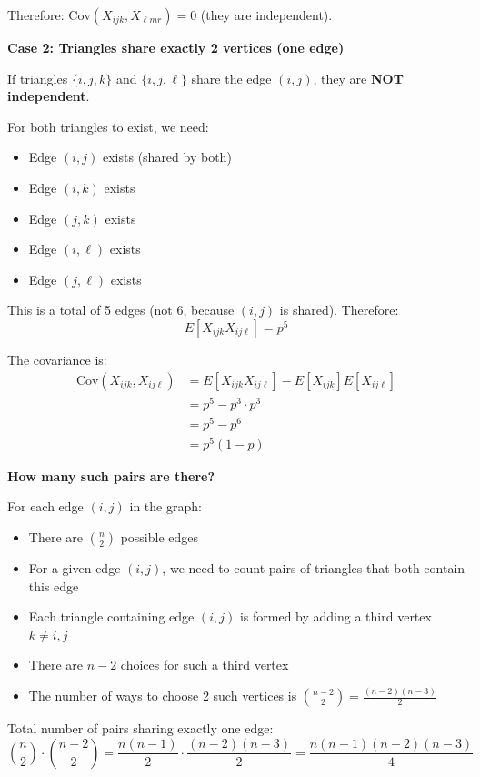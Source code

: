\documentclass[11pt]{article}
\begin{document}
Therefore: $\text{Cov}(X_{ijk}, X_{\ell m r}) = 0$ (they are independent).

\vspace{0.5em}

\textbf{Case 2: Triangles share exactly 2 vertices (one edge)}

If triangles $\{i,j,k\}$ and $\{i,j,\ell\}$ share the edge $(i,j)$, they are \textbf{NOT independent}.

For both triangles to exist, we need:
\begin{itemize}[leftmargin=2em]
    \item Edge $(i,j)$ exists (shared by both)
    \item Edge $(i,k)$ exists
    \item Edge $(j,k)$ exists
    \item Edge $(i,\ell)$ exists
    \item Edge $(j,\ell)$ exists
\end{itemize}

This is a total of 5 edges (not 6, because $(i,j)$ is shared). Therefore:
\[
E[X_{ijk} X_{ij\ell}] = p^5
\]

The covariance is:
\begin{align*}
\text{Cov}(X_{ijk}, X_{ij\ell}) &= E[X_{ijk} X_{ij\ell}] - E[X_{ijk}] E[X_{ij\ell}] \\
&= p^5 - p^3 \cdot p^3 \\
&= p^5 - p^6 \\
&= p^5(1 - p)
\end{align*}

\textbf{How many such pairs are there?}

For each edge $(i,j)$ in the graph:
\begin{itemize}[leftmargin=2em]
    \item There are $\binom{n}{2}$ possible edges
    \item For a given edge $(i,j)$, we need to count pairs of triangles that both contain this edge
    \item Each triangle containing edge $(i,j)$ is formed by adding a third vertex $k \neq i, j$
    \item There are $n-2$ choices for such a third vertex
    \item The number of ways to choose 2 such vertices is $\binom{n-2}{2} = \frac{(n-2)(n-3)}{2}$
\end{itemize}

Total number of pairs sharing exactly one edge:
\[
\binom{n}{2} \cdot \binom{n-2}{2} = \frac{n(n-1)}{2} \cdot \frac{(n-2)(n-3)}{2} = \frac{n(n-1)(n-2)(n-3)}{4}
\]
\end{document}

